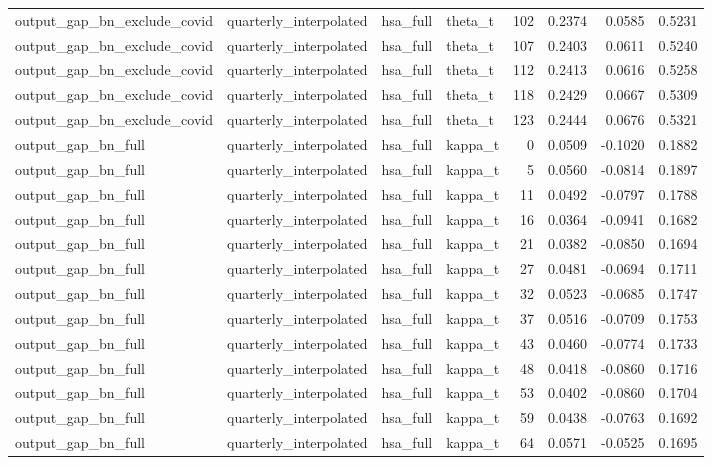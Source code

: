 \begin{tabular}{llllrrrr}
output\_gap\_bn\_exclude\_covid & quarterly\_interpolated & hsa\_full & theta\_t & 102 & 0.2374 & 0.0585 & 0.5231 \\
output\_gap\_bn\_exclude\_covid & quarterly\_interpolated & hsa\_full & theta\_t & 107 & 0.2403 & 0.0611 & 0.5240 \\
output\_gap\_bn\_exclude\_covid & quarterly\_interpolated & hsa\_full & theta\_t & 112 & 0.2413 & 0.0616 & 0.5258 \\
output\_gap\_bn\_exclude\_covid & quarterly\_interpolated & hsa\_full & theta\_t & 118 & 0.2429 & 0.0667 & 0.5309 \\
output\_gap\_bn\_exclude\_covid & quarterly\_interpolated & hsa\_full & theta\_t & 123 & 0.2444 & 0.0676 & 0.5321 \\
output\_gap\_bn\_full & quarterly\_interpolated & hsa\_full & kappa\_t & 0 & 0.0509 & -0.1020 & 0.1882 \\
output\_gap\_bn\_full & quarterly\_interpolated & hsa\_full & kappa\_t & 5 & 0.0560 & -0.0814 & 0.1897 \\
output\_gap\_bn\_full & quarterly\_interpolated & hsa\_full & kappa\_t & 11 & 0.0492 & -0.0797 & 0.1788 \\
output\_gap\_bn\_full & quarterly\_interpolated & hsa\_full & kappa\_t & 16 & 0.0364 & -0.0941 & 0.1682 \\
output\_gap\_bn\_full & quarterly\_interpolated & hsa\_full & kappa\_t & 21 & 0.0382 & -0.0850 & 0.1694 \\
output\_gap\_bn\_full & quarterly\_interpolated & hsa\_full & kappa\_t & 27 & 0.0481 & -0.0694 & 0.1711 \\
output\_gap\_bn\_full & quarterly\_interpolated & hsa\_full & kappa\_t & 32 & 0.0523 & -0.0685 & 0.1747 \\
output\_gap\_bn\_full & quarterly\_interpolated & hsa\_full & kappa\_t & 37 & 0.0516 & -0.0709 & 0.1753 \\
output\_gap\_bn\_full & quarterly\_interpolated & hsa\_full & kappa\_t & 43 & 0.0460 & -0.0774 & 0.1733 \\
output\_gap\_bn\_full & quarterly\_interpolated & hsa\_full & kappa\_t & 48 & 0.0418 & -0.0860 & 0.1716 \\
output\_gap\_bn\_full & quarterly\_interpolated & hsa\_full & kappa\_t & 53 & 0.0402 & -0.0860 & 0.1704 \\
output\_gap\_bn\_full & quarterly\_interpolated & hsa\_full & kappa\_t & 59 & 0.0438 & -0.0763 & 0.1692 \\
output\_gap\_bn\_full & quarterly\_interpolated & hsa\_full & kappa\_t & 64 & 0.0571 & -0.0525 & 0.1695 \\

\end{tabular}
